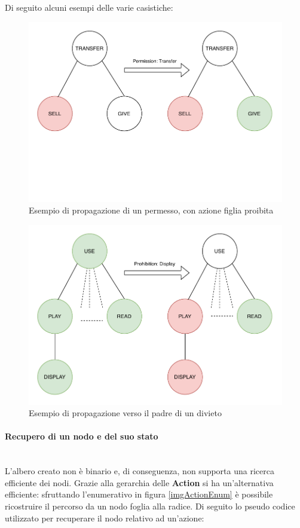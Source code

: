 \documentclass[12pt,a4paper,twoside]{book}
\begin{document}
Di seguito alcuni esempi delle varie casistiche:
\begin{figure}[H]
\centering
\includegraphics[scale=.50]{../immagini/propagationPerm}
\caption{Esempio di propagazione di un permesso, con azione figlia proibita}
\label{examplePerm}
\end{figure}
\begin{figure}[htp]
\centering
\includegraphics[scale=.50]{../immagini/propagationProParent}
\caption{Esempio di propagazione verso il padre di un divieto}
\label{exampleProParent}
\end{figure}

\paragraph{Recupero di un nodo e del suo stato}\mbox{}\\
L'albero creato non è binario e, di conseguenza, non supporta una ricerca efficiente dei nodi. Grazie alla gerarchia delle \textbf{Action} si ha un'alternativa efficiente: sfruttando l'enumerativo in figura \ref{imgActionEnum} è possibile ricostruire il percorso da un nodo foglia alla radice. Di seguito lo pseudo codice utilizzato per recuperare il nodo relativo ad un'azione:\\
\end{document}
